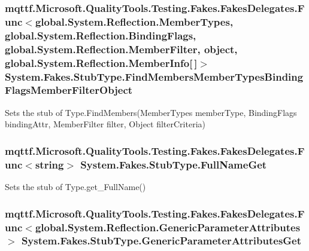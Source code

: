 \hypertarget{class_system_1_1_fakes_1_1_stub_type_a2b494818cc4e5b3178621d5f487521d8}{
\subsubsection[{Find\-Members\-Member\-Types\-Binding\-Flags\-Member\-Filter\-Object}]{\setlength{\rightskip}{0pt plus 5cm}mqttf.\-Microsoft.\-Quality\-Tools.\-Testing.\-Fakes.\-Fakes\-Delegates.\-Func$<$global.\-System.\-Reflection.\-Member\-Types, global.\-System.\-Reflection.\-Binding\-Flags, global.\-System.\-Reflection.\-Member\-Filter, object, global.\-System.\-Reflection.\-Member\-Info\mbox{[}$\,$\mbox{]}$>$ System.\-Fakes.\-Stub\-Type.\-Find\-Members\-Member\-Types\-Binding\-Flags\-Member\-Filter\-Object}}\label{class_system_1_1_fakes_1_1_stub_type_a2b494818cc4e5b3178621d5f487521d8}


Sets the stub of Type.\-Find\-Members(\-Member\-Types member\-Type, Binding\-Flags binding\-Attr, Member\-Filter filter, Object filter\-Criteria)

\hypertarget{class_system_1_1_fakes_1_1_stub_type_a20fadc18280ce1e362d6c4babce42889}{
\subsubsection[{Full\-Name\-Get}]{\setlength{\rightskip}{0pt plus 5cm}mqttf.\-Microsoft.\-Quality\-Tools.\-Testing.\-Fakes.\-Fakes\-Delegates.\-Func$<$string$>$ System.\-Fakes.\-Stub\-Type.\-Full\-Name\-Get}}\label{class_system_1_1_fakes_1_1_stub_type_a20fadc18280ce1e362d6c4babce42889}


Sets the stub of Type.\-get\-\_\-\-Full\-Name()

\hypertarget{class_system_1_1_fakes_1_1_stub_type_adeba7a167b13b63eb2571e544e0340ac}{
\subsubsection[{Generic\-Parameter\-Attributes\-Get}]{\setlength{\rightskip}{0pt plus 5cm}mqttf.\-Microsoft.\-Quality\-Tools.\-Testing.\-Fakes.\-Fakes\-Delegates.\-Func$<$global.\-System.\-Reflection.\-Generic\-Parameter\-Attributes$>$ System.\-Fakes.\-Stub\-Type.\-Generic\-Parameter\-Attributes\-Get}}\label{class_system_1_1_fakes_1_1_stub_type_adeba7a167b13b63eb2571e544e0340ac}


